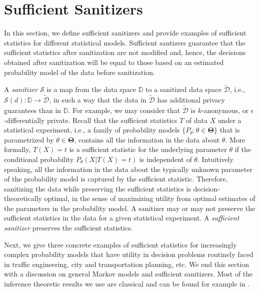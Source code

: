 \documentclass[times,twocolumn,final,authoryear]{elsarticle}
\begin{document}
\section{Sufficient Sanitizers}\label{Sec:SufficientSanitizer}
{\color{blue} In this section, we define sufficient sanitizers and provide examples of sufficient statistics for different statistical models.
Sufficient santizers guarantee that the sufficient statistics after sanitization are not modified and, hence, the decisions obtained after sanitization will be equal to those based on an estimated probability model of the data before sanitization.
}

A {\em sanitizer} $\mathcal{S}$ is a map from the data space $\mathbb{D}$ to a sanitized data space $\tilde{\mathcal{D}}$, i.e., $\mathcal{S}(d): \mathbb{D} \to \tilde{\mathcal{D}}$, in such a way that the data in $\tilde{\mathcal{D}}$ has additional privacy guarantees than in $\mathbb{D}$.
{\color{blue} For example, we may consider that  $\tilde{\mathcal{D}}$ is $k$-anonymous, or $\epsilon$-differentially private.}
Recall that the sufficient statistics $T$ of data $X$ under a statistical experiment, i.e., a family of probability models $\{P_{\theta}: \theta \in \mathbf{\Theta}\}$ that is parametrized by $\theta \in \mathbf{\Theta}$, contains all the information in the data about $\theta$.  
More formally, $T(X)=t$ is a sufficient statistic for the underlying parameter $\theta$ if the conditional probability $P_{\theta}(X | T(X)=t)$ is independent of $\theta$.  
Intuitively speaking, all the information in the data about the typically unknown parameter of the probability model is captured by the sufficient statistic.  
Therefore, sanitizing the data while preserving the sufficient statistics is decision-theoretically optimal, in the sense of maximizing utility from optimal estimates of the parameters in the probability model. 
A sanitizer may or may not preserve the sufficient statistics in the data for a given statistical experiment.
A {\em sufficient sanitizer} preserves the sufficient statistics. 

Next, we give three concrete examples of sufficient statistics for increasingly complex probability models that have utility in decision problems routinely faced in traffic engineering, city and transportation planning, etc.  
We end this section with a discussion on general Markov models and sufficient sanitizers.  Most of the inference theoretic results we use are classical and can be found for example in \cite{Billingsley:1961}.
\end{document}
